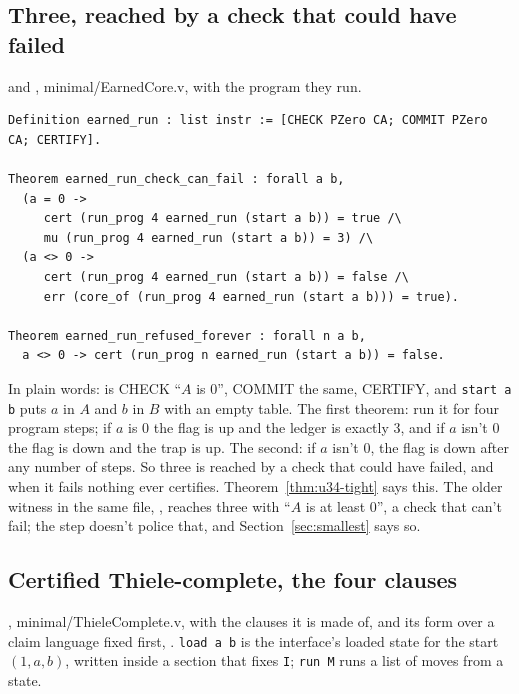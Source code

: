 \subsection{Three, reached by a check that could have failed}

{\raggedright {} and , minimal/EarnedCore.v, with the program they run.\par}

{\scriptsize
\begin{verbatim}
Definition earned_run : list instr := [CHECK PZero CA; COMMIT PZero CA; CERTIFY].

Theorem earned_run_check_can_fail : forall a b,
  (a = 0 ->
     cert (run_prog 4 earned_run (start a b)) = true /\
     mu (run_prog 4 earned_run (start a b)) = 3) /\
  (a <> 0 ->
     cert (run_prog 4 earned_run (start a b)) = false /\
     err (core_of (run_prog 4 earned_run (start a b))) = true).

Theorem earned_run_refused_forever : forall n a b,
  a <> 0 -> cert (run_prog n earned_run (start a b)) = false.
\end{verbatim}}

In plain words: \code{earned\_run} is CHECK ``$A$ is 0'', COMMIT the same, CERTIFY, and
\texttt{start a b} puts $a$ in $A$ and $b$ in $B$ with an empty table. The first theorem: run it
for four program steps; if $a$ is 0 the flag is up and the ledger is exactly 3, and if $a$
isn't 0 the flag is down and the trap is up. The second: if $a$ isn't 0, the flag is down after
any number of steps. So three is reached by a check that could have failed, and when it fails
nothing ever certifies. Theorem~\ref{thm:u34-tight} says this. The older witness in the same
file, \code{min\_cost\_tight}, reaches three with ``$A$ is at least 0'', a check that can't
fail; the step doesn't police that, and Section~\ref{sec:smallest} says so.

\subsection{Certified Thiele-complete, the four clauses}

{\raggedright {}, minimal/ThieleComplete.v, with the clauses it is made of, and its form over a claim language fixed first, . \texttt{load a b} is the interface's loaded state for the start $(1, a, b)$, written inside a section that fixes \texttt{I}; \texttt{run M} runs a list of moves from a state.\par}

